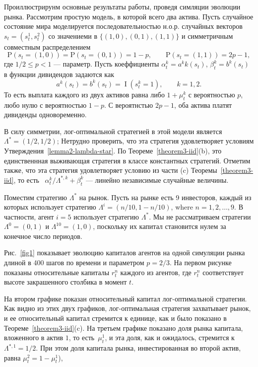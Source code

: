\documentclass[a4paper,12pt,russian]{article} %
\theoremstyle{definition}
\DeclareMathOperator{\I}{I}
\renewcommand{\P}{\mathrm{P}}
\begin{document}
Проиллюстрирунм основные результаты работы, проведя симляции эволюции рынка. Рассмотрим простую модель, в которой всего два актива.
Пусть случайное состояние мира моделируется последовательностью н.о.р. случайных векторов
 $s_t=(s_t^1,s_t^2)$  со значениеми в $\{(1,0), (0,1), (1,1)\}$ и симметричным совместным распределением
\[
\P(s_t = (1,0)) = \P(s_t=(0,1)) = 1-p, \qquad \P(s_t=(1,1)) = 2p-1,
\]
где $1/2\le p< 1$ — параметр. Пусть коеффициенты $\alpha_{t}^k = a^kk(s_t)$, $\beta_{t}^k = b^k(s_t)$ в функции дивидендов задаются как
\[
a^k(s_t) = b^k(s_t) = \I(s_t^k=1), \qquad k=1,2.
\]
То есть выплата каждого из двух активов равна либо $1 + \mu_{t}^k$ с вероятностью $p$, любо нулю с вероятностью $1-p$.
С вероятнстью $2p-1$, оба актива платят дивиденды одновоременно. 

В силу симметрии, лог-оптимальной стратегией в этой модели является $\Lambda^*=(1/2, 1/2)$; Нетрудно проверить, что эта стратегия удовлетворяет условиям Утверждения~\ref{lemma2-lambda-star}. 
По Теореме~\ref{theorem3-iid}(b), это единственнная выживающая стратегия в классе константных стратегий.
Отметим также, что эта стратегия удовлетворяет условию из части (c)  Теоремы~\ref{theorem3-iid}, то есть \ $\alpha_{t}^k/\Lambda^{*,k} + \beta_{t}^k$ — линейно независимые случайные величины.

Поместим стратегию $\Lambda^*$ на рынок.
Пусть на рынке есть 9 инвесторов, каждый из которых использует стратегию $\Lambda^i = (n/10, 1-n/10)$, where $n=1,2,\dots,9$. В частности, агент $i=5$ использует стратегию $\Lambda^*$.
Мы не рассматриваем стратегии $\Lambda^0=(0,1)$ и $\Lambda^{10} = (1,0)$, поскольку их капитал становится нулем за конечное число периодов.

Рис.~\ref{fig1} показывает эволюцию капиталов агентов на одной симуляции рынка длиной в 400 шагов по времени и параметром $p=2/3$. 
На первом рисунке показаны относительные капиталы  $r_t^n$ каждого из агентов, где $r_t^n$ соответствует высоте закрашенного столбика в момент $t$.

На втором графике показан относительный капитал лог-оптимальной стратегии.
Как видно из этих двух графиков, лог-оптимальная стратегия захватывает рынок, и ее относительный капитал стремится к единице, как и было показано в Теореме~\ref{theorem3-iid}(c).
На третьем графике показано доля рынка капитала, вложенного в актив $1$, то есть\ $\mu_{t}^1$, и эта доля, как и ожидалось, стремится к $\Lambda^{*,1} = 1/2$. При этом доля капитала рынка, инвестированная во второй актив, равна $\mu_{t}^2 = 1-\mu_{t}^1$), 
\end{document}
